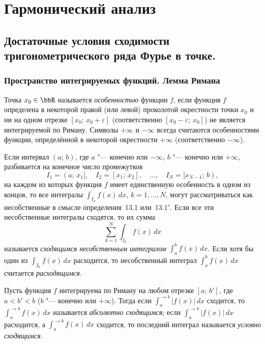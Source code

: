 \part{Гармонический анализ}

\chapter{Достаточные условия сходимости тригонометрического ряда Фурье в точке.}\label{chapter17}

\section{Пространство интегрируемых функций. Лемма Римана}

\begin{defn} \label{df13:2}
Точка $x_0 \in \bbR$ называется \textit{особенностью} функции $f$, если функция $f$ определена в некоторой правой (или левой) проколотой окрестности точки $x_0$ и ни на одном отрезке $[x_0;\, x_0 + \varepsilon]$ (соответственно $[x_0 - \varepsilon;\, x_0]$) не является интегрируемой по Риману. Символы $+\infty$ и $-\infty$ всегда считаются особенностями функции, определённой в некоторой окрестности $+\infty$ (соответственно $-\infty$).

Если интервал $(a;\, b)$, где $a$ "--- конечно или $-\infty$, $b$ "--- конечно или $+\infty$, разбивается на конечное число промежутков
$$
I_1 = (a;\, x_1],\quad I_2 = [x_1;\, x_2],\quad \ldots,\quad I_N = [x_{N-1};\, b),
$$
на каждом из которых функция $f$ имеет единственную особенность в одном из концов, то все интегралы $\int_{I_k} f(x)\,dx$, $k = 1, \ldots, N$, могут рассматриваться как несобственные в смысле определения~13.1 или~13.1$'$. Если все эти несобственные интегралы сходятся, то их сумма
$$
\sum_{k=1}^{N} \int_{I_k} f(x)\,dx
$$
называется \textit{сходящимся несобственным интегралом} $\int_a^b f(x)\,dx$. Если хотя бы один из $\int_{I_k} f(x)\,dx$ расходится, то несобственный интеграл $\int_a^b f(x)\,dx$ считается \textit{расходящимся}.
\end{defn}

\begin{defn} \label{df13:3}
Пусть функция $f$ интегрируема по Риману на любом отрезке $[a;\, b']$, где $a < b' < b$ ($b$ "--- конечно или $+\infty$). Тогда если $\int_a^{\to b} |f(x)|\,dx$ сходится, то $\int_a^{\to b} f(x)\,dx$ называется \textit{абсолютно сходящимся}; если $\int_a^{\to b} |f(x)|\,dx$ расходится, а $\int_a^{\to b} f(x)\,dx$ сходится, то последний интеграл называется \textit{условно сходящимся}.
\end{defn}

